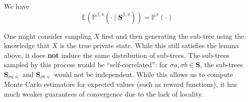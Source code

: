 \documentclass[12pt, a4paper]{article}
\begin{document}
\begin{lemma}\label{lem:branched-terminal-distribution}
    We have
    \begin{equation}\label{eq:branched-terminal-distribution}
        \mathbb{E}(\mathbb{P}^{\beta, \pi}(\cdot \mid \mathbf{S}^{\beta, \pi})) = \mathbb{P}^\pi(\cdot)
    \end{equation}
\end{lemma}

\begin{warning}\label{warn:no-private-tilting}
    One might consider sampling $X$ first and then generating the sub-tree using the knowledge that $X$ is the true private state.
    While this still satisfies the lemma above, it does \textbf{not} induce the same distribution of sub-trees.
    The sub-trees sampled by this process would be ``self-correlated'': for $\sigma a, \sigma b\in \mathbf{S}$, the sub-trees $\mathbf{S}_{\sigma a \preccurlyeq}$ and $\mathbf{S}_{\sigma b \preccurlyeq}$ would not be independent.
    While this allows us to compute Monte Carlo estimators for expected values (such as reward functions), it has much weaker guarantees of convergence due to the lack of locality.
\end{warning}
\end{document}
